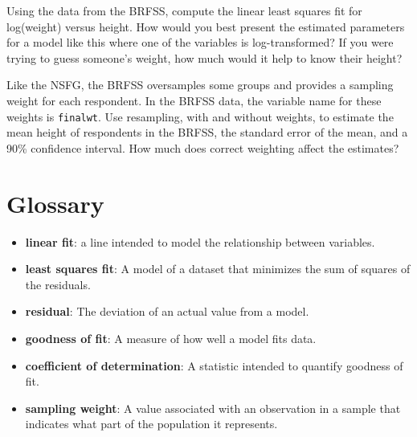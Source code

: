 \documentclass[12pt]{book}
\begin{document}
\begin{exercise}

Using the data from the BRFSS, compute the linear least squares
fit for log(weight) versus height.
How would you best present the estimated parameters for a model
like this where one of the variables is log-transformed?
If you were trying to guess
someone's weight, how much would it help to know their height?

Like the NSFG, the BRFSS oversamples some groups and provides
a sampling weight for each respondent.  In the BRFSS data, the variable
name for these weights is \verb"finalwt".
Use resampling, with and without weights, to estimate the mean height
of respondents in the BRFSS, the standard error of the mean, and a
90\% confidence interval.  How much does correct weighting affect the
estimates?
\end{exercise}


\section{Glossary}

\begin{itemize}

\item {\bf linear fit}: a line intended to model the relationship between
variables.  

\item {\bf least squares fit}: A model of a dataset that minimizes the
sum of squares of the residuals.

\item {\bf residual}: The deviation of an actual value from a model.

\item {\bf goodness of fit}: A measure of how well a model fits data.

\item {\bf coefficient of determination}: A statistic intended to
quantify goodness of fit.

\item {\bf sampling weight}: A value associated with an observation in a
  sample that indicates what part of the population it represents.

\end{itemize}
\end{document}
